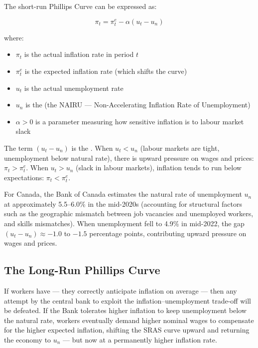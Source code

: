 The short-run Phillips Curve can be expressed as:

\begin{equation}
  \pi_t = \pi^e_t - \alpha(u_t - u_n)
  \label{eq:phillips_curve}
\end{equation}

\noindent where:
\begin{itemize}
  \item $\pi_t$ is the actual inflation rate in period $t$
  \item $\pi^e_t$ is the expected inflation rate (which shifts the curve)
  \item $u_t$ is the actual unemployment rate
  \item $u_n$ is the  (the NAIRU ---
        Non-Accelerating Inflation Rate of Unemployment)
  \item $\alpha > 0$ is a parameter measuring how sensitive inflation is
        to labour market slack
\end{itemize}

The term $(u_t - u_n)$ is the . When $u_t < u_n$
(labour markets are tight, unemployment below natural rate), there is
upward pressure on wages and prices: $\pi_t > \pi^e_t$. When
$u_t > u_n$ (slack in labour markets), inflation tends to run below
expectations: $\pi_t < \pi^e_t$.

For Canada, the Bank of Canada estimates the natural rate of unemployment
$u_n$ at approximately 5.5--6.0\% in the mid-2020s (accounting for
structural factors such as the geographic mismatch between job vacancies
and unemployed workers, and skills mismatches). When unemployment fell
to 4.9\% in mid-2022, the gap $(u_t - u_n) \approx -1.0$ to $-1.5$
percentage points, contributing upward pressure on wages and prices.

\subsection{The Long-Run Phillips Curve}

If workers have  --- they correctly anticipate
inflation on average --- then any attempt by the central bank to exploit
the inflation--unemployment trade-off will be defeated. If the Bank
tolerates higher inflation to keep unemployment below the natural rate,
workers eventually demand higher nominal wages to compensate for the
higher expected inflation, shifting the SRAS curve upward and returning
the economy to $u_n$ --- but now at a permanently higher inflation rate.

